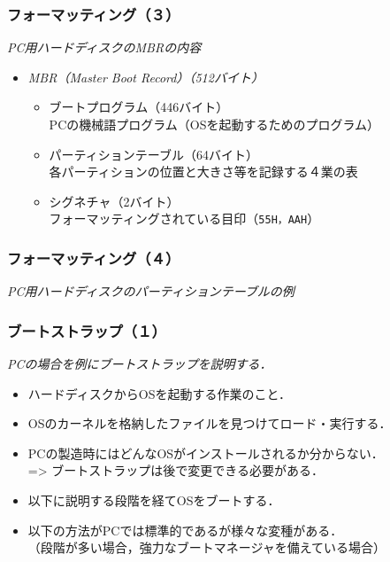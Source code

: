 \documentclass[unicode]{beamer}                   %
\begin{document}
\begin{frame}
  \frametitle{フォーマッティング（３）}
  \emph{PC用ハードディスクのMBRの内容}
  \begin{itemize}
  \item \emph{MBR（Master Boot Record）（512バイト）} \\
    \begin{itemize}
    \item ブートプログラム（446バイト） \\
      PCの機械語プログラム（OSを起動するためのプログラム）
    \item パーティションテーブル（64バイト） \\
      各パーティションの位置と大きさ等を記録する４業の表 \\
    \item シグネチャ（2バイト） \\
      フォーマッティングされている目印（\texttt{55H，AAH}）
    \end{itemize}
  \end{itemize}
\end{frame}

\begin{frame}
  \frametitle{フォーマッティング（４）}
  \emph{PC用ハードディスクのパーティションテーブルの例}
  \begin{center}
    \begin{minipage}{0.64\columnwidth}
    \end{minipage}
    \begin{minipage}{0.34\columnwidth}
    \end{minipage}
  \end{center}
\end{frame}

\begin{frame}
  \frametitle{ブートストラップ（１）}
  \emph{PCの場合を例にブートストラップを説明する．}
  \begin{itemize}
  \item ハードディスクからOSを起動する作業のこと．
  \item OSのカーネルを格納したファイルを見つけてロード・実行する．
  \item PCの製造時にはどんなOSがインストールされるか分からない． \\
    => ブートストラップは後で変更できる必要がある．
  \item 以下に説明する段階を経てOSをブートする．
  \item 以下の方法がPCでは標準的であるが様々な変種がある．\\
    （段階が多い場合，強力なブートマネージャを備えている場合）
  \end{itemize}
\end{frame}
\end{document}
